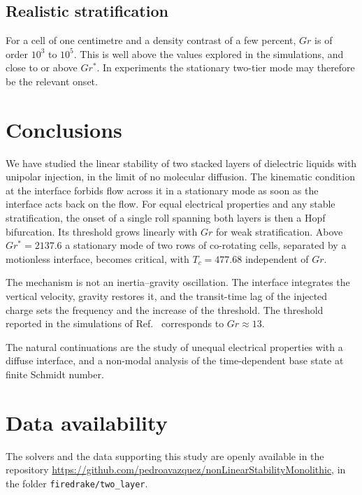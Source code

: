 \documentclass[aip,pof,reprint,amsmath,amssymb]{revtex4-2}
\begin{document}
\subsection{Realistic stratification}

For a cell of one centimetre and a density contrast of a few percent, $Gr$ is of order
$10^3$ to $10^5$. This is well above the values explored in the simulations, and close to
or above $Gr^*$. In experiments the stationary two-tier mode may therefore be the relevant
onset.

\section{Conclusions}

We have studied the linear stability of two stacked layers of dielectric liquids with
unipolar injection, in the limit of no molecular diffusion. The kinematic condition at the
interface forbids flow across it in a stationary mode as soon as the interface acts back
on the flow. For equal electrical properties and any stable stratification, the onset of a
single roll spanning both layers is then a Hopf bifurcation. Its threshold grows linearly
with $Gr$ for weak stratification. Above $Gr^*=2137.6$ a stationary mode of two rows of
co-rotating cells, separated by a motionless interface, becomes critical, with
$T_c=477.68$ independent of $Gr$.

The mechanism is not an inertia--gravity oscillation. The interface integrates the
vertical velocity, gravity restores it, and the transit-time lag of the injected charge
sets the frequency and the increase of the threshold. The threshold reported in the
simulations of Ref.~ corresponds to $Gr\approx13$.

The natural continuations are the study of unequal electrical properties with a diffuse
interface, and a non-modal analysis of the time-dependent base state at finite Schmidt
number.

\begin{acknowledgments}
\end{acknowledgments}

\section*{Data availability}
The solvers and the data supporting this study are openly available in the repository
\url{https://github.com/pedroavazquez/nonLinearStabilityMonolithic}, in the folder
\texttt{firedrake/two\_layer}.
\end{document}
